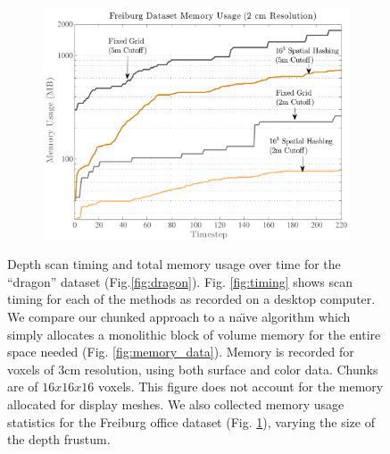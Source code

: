 \documentclass[10pt,twocolumn,letterpaper]{article}
\begin{document}
\begin{figure}
\begin{subfigure}{0.75\columnwidth}
\includegraphics[width=1.0\textwidth]{img/memoryusage2.pdf}
		 \caption{} 
		 \label{fig:memory_data2}
	 \end{subfigure} 
      \caption{Depth scan timing and total memory usage over time for the
      ``dragon'' dataset (Fig.\ref{fig:dragon}). Fig. \ref{fig:timing} shows
      scan timing for 
each of the methods as recorded on a desktop computer. We compare our chunked
      approach to a na\"{\i}ve algorithm which simply allocates a monolithic
      block of volume memory for the entire space needed (Fig. \ref{fig:memory_data}).
      Memory is recorded for voxels of 3cm resolution, using both surface and
      color data. Chunks are of $16x16x16$ voxels. This figure does not account
      for the memory allocated for display meshes. We also collected memory
      usage statistics for the Freiburg \cite{FREIBURG} office dataset (Fig.
      \ref{fig:memory_data2}), varying the size of the depth frustum.}
  \label{fig:memory}
\end{figure} 
\end{document}
